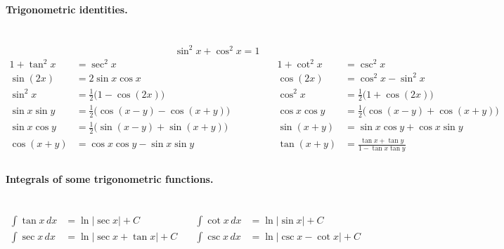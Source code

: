 \documentclass[11pt]{exam}
\begin{document}
\paragraph{Trigonometric identities.}\mbox{}\\
\vspace{-2em}
\begin{align*}
  &\hspace{10em}\sin^2{x}+\cos^2{x} = 1 &&\\
  1+\tan^2{x} &= \sec^2{x} &\quad 1+\cot^2{x} &= \csc^2{x}\\
  \sin{(2x)} &= 2\sin{x}\cos{x} &\quad  \cos{(2x)} &= \cos^2{x}-\sin^2{x} \\
  \sin^2{x} &= \frac{1}{2}\big(1-\cos(2x)\big) &\quad  \cos^2{x} &= \frac{1}{2}\big(1+\cos(2x)\big)\\
  \sin{x}\sin{y} &= \frac{1}{2}\big(\cos{(x-y)} - \cos{(x+y)}\big) &\quad
  \cos{x}\cos{y} &= \frac{1}{2}\big(\cos{(x-y)} + \cos{(x+y)}\big)\\
  \sin{x}\cos{y} &= \frac{1}{2}\big(\sin{(x-y)} + \sin{(x+y)}\big) &\quad
  \sin{(x+y)} &= \sin{x}\cos{y}+\cos{x}\sin{y}\\
  \cos{(x+y)} &= \cos{x}\cos{y}-\sin{x}\sin{y} &\quad
  \tan{(x+y)} &= \frac{\tan{x}+\tan{y}}{1-\tan{x}\tan{y}}\\
\end{align*}

\paragraph{Integrals of some trigonometric functions.}\mbox{}\\
\vspace{-1em}
\begin{align*}
  \int{\tan{x}\,dx} &= \ln{|\sec{x}|}+C & \quad \int{\cot{x}\,dx} &= \ln{|\sin{x}|}+C\\
  \int{\sec{x}\,dx} &= \ln{|\sec{x}+\tan{x}|}+C & \quad \int{\csc{x}\,dx} &= \ln{|\csc{x}-\cot{x}|}+C\\
\end{align*}
\end{document}
